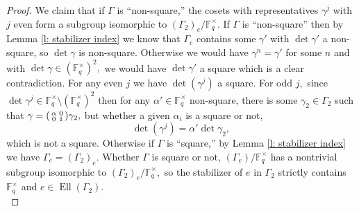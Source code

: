 \documentclass[11pt]{amsart}
\theoremstyle{definition}
\newenvironment{psmallmatrix}
{\left(\begin{smallmatrix}}
	{\end{smallmatrix}\right)}
\numberwithin{equation}{section}
\newcommand{\bbF}{\mathbb{F}}		%
\begin{document}
\begin{proof}
			We claim that if $\Gamma$ is ``non-square,'' the cosets with representatives 
			$\gamma^j$
			with $j$ even form a subgroup isomorphic to $(\Gamma_2)_e/\bbF_q^{\times}.$ 
			If $\Gamma$ is ``non-square'' then by Lemma \ref{l: stabilizer index} we know that $\Gamma_e$ contains some $\gamma'$ with $\det\gamma'$ a non-square, so $\det\gamma$ is non-square. Otherwise we would have $\gamma^n=\gamma'$ for some $n$ and with $\det\gamma\in (\bbF_q^{\times})^2,$ we would have $\det\gamma'$ a square which is a clear contradiction.
			For any even $j$ we have $\det(\gamma^j)$ a square.
			For odd $j,$ since $\det\gamma^j\in \bbF_q^{\times}\setminus(\bbF_q^{\times})^2$ then for any $\alpha'\in \bbF_q^{\times}$ non-square, there is some $\gamma_2\in \Gamma_2$ such that $\displaystyle{\gamma=\begin{psmallmatrix}\alpha&0\\0&1\end{psmallmatrix}\gamma_2},$ but whether a given $\alpha_i$ is a square or not, 
			\[\det(\gamma^j)=\alpha'\det\gamma_2,\]
			which is not a square. Otherwise if $\Gamma$ is ``square,'' by Lemma \ref{l: stabilizer index} we have $\Gamma_e=(\Gamma_2)_e.$  
			Whether $\Gamma$ is square or not, $(\Gamma_e)/\bbF_q^{\times}$ has a nontrivial subgroup isomorphic to $(\Gamma_2)_e/\bbF_q^{\times},$ so the stabilizer of $e$ in $\Gamma_2$ strictly contains $\bbF_q^{\times}$ and $e\in \operatorname{Ell}(\Gamma_2).$\\
			

\end{proof}
\end{document}
